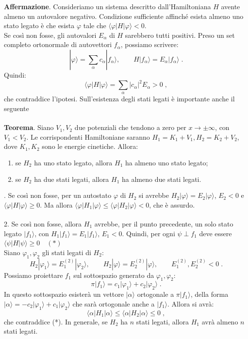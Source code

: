 \documentclass[10pt,a4paper]{report}
\theoremstyle{definition}
\numberwithin{equation}{section}
\newcommand{\bra}{\langle}
\newcommand{\ket}{\rangle}
\begin{document}
\textbf{Affermazione}. Consideriamo un sistema descritto dall'Hamiltoniana $H$ avente almeno un autovalore negativo. Condizione sufficiente affinché esista almeno uno stato legato è che esista $\varphi$ tale che $\bra\varphi|H|\varphi\ket<0$. \\
\proof
Se così non fosse, gli autovalori $E_{\alpha}$ di $H$ sarebbero tutti positivi. Preso un set completo ortonormale di autovettori $f_{\alpha}$, possiamo scrivere:
$$
|\varphi\ket=\sum_{\alpha} c_{\alpha}|f_{\alpha}\ket,\qquad H|f_{\alpha}\ket=E_{\alpha}|f_{\alpha}\ket\;.
$$
Quindi:
$$
\bra\varphi|H|\varphi\ket=\sum_{\alpha} |c_{\alpha}|^2 E_{\alpha}>0\;,
$$
che contraddice l'ipotesi.
\endproof
Sull'esistenza degli stati legati è importante anche il seguente \\
\\
\textbf{Teorema}. Siano $V_1,V_2$ due potenziali che tendono a zero per $x\to\pm\infty$, con $V_1<V_2$. Le corrispondenti Hamiltoniane saranno $H_1=K_1+V_1, H_2=K_2+V_2$, dove $K_1,K_2$ sono le energie cinetiche. Allora:
\begin{enumerate}
\item se $H_2$ ha uno stato legato, allora $H_1$ ha almeno uno stato legato;
\item se $H_2$ ha due stati legati, allora $H_1$ ha almeno due stati legati.
\end{enumerate}
. Se così non fosse, per un autostato $\varphi$ di $H_2$ si avrebbe $H_2|\varphi\ket=E_2|\varphi\ket$, $E_2<0$ e $\bra\varphi|H|\varphi\ket\ge 0$. Ma allora $\bra\varphi|H_1|\varphi\ket\le\bra\varphi|H_2|\varphi\ket<0$, che è assurdo.\\
\\
2. Se così non fosse, allora $H_1$ avrebbe, per il punto precedente, un solo stato legato $|f_1\ket$, con $H_1|f_1\ket=E_1|f_1\ket$, $E_1<0$. Quindi, per ogni $\psi\perp f_1$ deve essere $\bra\psi|H|\psi\ket\ge 0 \quad (*)$ \\
Siano $\varphi_1,\varphi_2$ gli stati legati di $H_2$:
$$
H_2|\varphi_1\ket=E_1^{(2)}|\varphi_2\ket,\qquad H_2|\varphi\ket=E_2^{(2)}|\varphi\ket,\qquad E_1^{(2)},E_2^{(2)}<0\;.
$$
Possiamo proiettare $f_1$ sul sottospazio generato da $\varphi_1,\varphi_2$:
$$
\pi|f_1\ket=c_1|\varphi_1\ket+c_2|\varphi_2\ket\;.
$$
In questo sottospazio esisterà un vettore $|\alpha\ket$ ortogonale a $\pi|f_1\ket$, della forma $|\alpha\ket=-c_2|\varphi_1\ket+c_1|\varphi_2\ket$ che sarà ortogonale anche a $|f_1\ket$. Allora si avrà:
$$
\bra \alpha|H_1|\alpha\ket\le \bra\alpha|H_2|\alpha\ket\le 0\;,
$$
che contraddice (*).
\endproof
In generale, se $H_2$ ha $n$ stati legati, allora $H_1$ avrà almeno $n$ stati legati.
\end{document}
